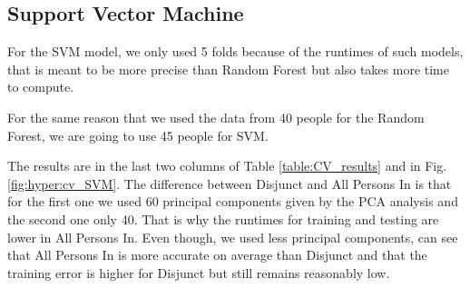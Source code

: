 \documentclass[conference]{IEEEtran}
\begin{document}
\subsection{Support Vector Machine}
\textcolor{baptiste}{For the SVM model, we only used 5 folds because of the runtimes of such models, that is meant to be more precise than Random Forest but also takes more time to compute.}

\textcolor{baptiste}{For the same reason that we used the data from 40 people for the Random Forest, we are going to use 45 people for SVM.
}

\textcolor{baptiste}{The results are in the last two columns of Table \ref{table:CV_results} and in Fig. \ref{fig:hyper:cv_SVM}. The difference between Disjunct and All Persons In is that for the first one we used 60 principal components given by the PCA analysis and the second one only 40. That is why the runtimes for training and testing are lower in All Persons In. Even though, we used less principal components, can see that All Persons In is more accurate on average than Disjunct and that the training error is higher for Disjunct but still remains reasonably low.}
\end{document}
